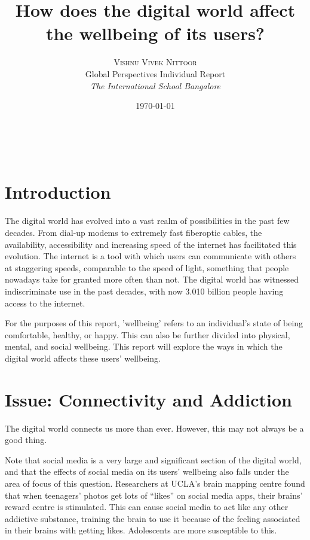 \documentclass[a4paper, 11pt]{article}
\title{\textbf{How does the digital world affect the wellbeing of its users?}}
\author{\textsc{Vishnu Vivek Nittoor} \\
      Global Perspectives Individual Report\\
      {\textit{The International School Bangalore}}
      }
\date{\today}
\makeatletter
\renewcommand{\maketitle}{
\begin{flushright}
{\LARGE\@title}

\vspace{20pt}

{\large\@author}
\\\@date %

\vspace{40pt} %
\end{flushright}
}
\makeatother
\begin{document}
\maketitle

\vspace{30pt}

\section*{Introduction}

The digital world has evolved into a vast realm of possibilities in the past few decades. From dial-up modems to extremely fast fiberoptic cables, the availability, accessibility and increasing speed of the internet has facilitated this evolution. The internet is a tool with which users can communicate with others at staggering speeds, comparable to the speed of light, something that people nowadays take for granted more often than not.\cite{speedoflight-communication} The digital world has witnessed indiscriminate use in the past decades, with now 3.010 billion people having access to the internet.\cite{world-population-online}

For the purposes of this report, 'wellbeing' refers to an individual's state of being comfortable, healthy, or happy. This can also be further divided into physical, mental, and social wellbeing.\cite{physical-wellbeing-definition, who-mental-wellbeing, social-wellbeing-definition} This report will explore the ways in which the digital world affects these users' wellbeing.

\section{Issue: Connectivity and Addiction}
    The digital world connects us more than ever. However, this may not always be a good thing.

    Note that social media is a very large and significant section of the digital world, and that the effects of social media on its users' wellbeing also falls under the area of focus of this question. Researchers at UCLA’s brain mapping centre found that when teenagers’ photos get lots of “likes” on social media apps, their brains’ reward centre is stimulated.\cite{teens-social-media-brain} This can cause social media to act like any other addictive substance, training the brain to use it because of the feeling associated in their brains with getting likes. Adolescents are more susceptible to this.
\end{document}
